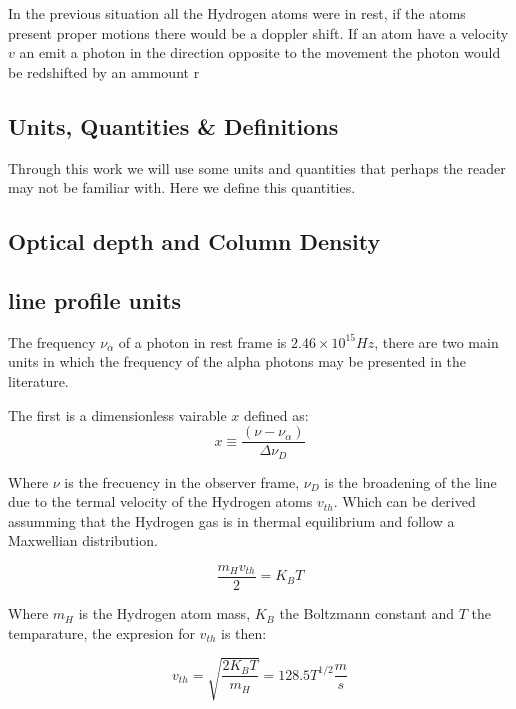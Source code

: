 In the previous situation all the Hydrogen atoms were in rest, if the atoms
present proper motions there would be a doppler shift. If an atom have a velocity 
$v$ an emit a \ly photon in the direction opposite to the movement the \ly photon 
would be redshifted by an ammount r  

 

\subsection{Units, Quantities \& Definitions}

Through this work we will use some units and quantities that perhaps the reader 
may not be familiar with. Here we define this quantities. 

\subsection{Optical depth and Column Density}

\subsection{\ly line profile units} 

The frequency $\nu_{\alpha}$ of a \ly photon in rest frame is 
$2.46\times 10^{15}Hz$, 
there are two main units in which the frequency of the \ly alpha photons 
may be presented in the literature.  

The first is a dimensionless vairable $x$ defined as:
\begin{equation}\label{eq:x}
x   \equiv \dfrac{(\nu -\nu_{\alpha})}{\Delta \nu_D}
\end{equation}

Where $\nu$ is the frecuency in the observer frame,  
$\nu_D$ is the broadening of the line due to the termal 
velocity of the Hydrogen atoms $v_{th}$. Which can be derived 
assumming that the Hydrogen gas is in thermal equilibrium 
and follow a Maxwellian distribution.

\begin{equation}
\dfrac{m_H v_{th}}{2} = K_B T 
\end{equation} 

Where $m_H$ is the Hydrogen atom mass, $K_B$ the Boltzmann constant and $T$ 
the temparature, the expresion for $v_{th}$ is then:

\begin{equation}
v_{th} = \sqrt{\dfrac{2 K_B T}{m_H}} = 128.5 T^{1/2}\dfrac{m}{s}
\end{equation}


